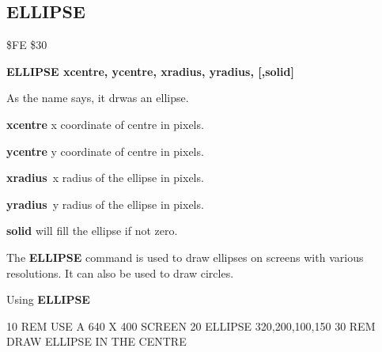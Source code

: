 
\newpage
\subsection{ELLIPSE}
\begin{description}[leftmargin=3cm,style=nextline]
\item [Token:] \$FE \$30
\item [Format:] {\bf ELLIPSE xcentre, ycentre,
                xradius, yradius, [,solid]}
\item [Usage:] As the name says, it drwas an ellipse.

               {\bf xcentre} x coordinate of centre in pixels.

               {\bf ycentre} y coordinate of centre in pixels.

               {\bf xradius} x radius of the ellipse in pixels.

               {\bf yradius} y radius of the ellipse in pixels.

               {\bf solid} will fill the ellipse if not zero.

\item [Remarks:] The {\bf ELLIPSE} command is used to draw ellipses on
               screens with various resolutions.
               It can also be used to draw circles.

\item [Example:] Using {\bf ELLIPSE}
\begin{screenoutput}
10 REM USE A 640 X 400 SCREEN
20 ELLIPSE 320,200,100,150
30 REM DRAW ELLIPSE IN THE CENTRE
\end{screenoutput}
\end{description}


\newpage
